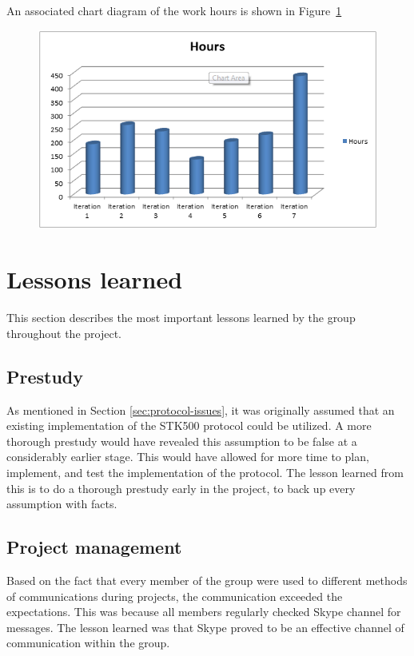 	An associated chart diagram of the work hours is shown in Figure~\ref{fig:workhours}

	\begin{figure}[H]
	\centering
	\label{fig:workhours}
	\includegraphics[scale=0.8]{images/workhours_chart2.png}
	\end{figure}

	\section{Lessons learned}
	This section describes the most important lessons learned by the group throughout the project. 

	\subsection{Prestudy}
	As mentioned in Section \ref{sec:protocol-issues}, it was originally assumed that an existing implementation of the STK500 protocol could be utilized. A more thorough prestudy would have revealed this assumption to be false at a considerably earlier stage. This would have allowed for more time to plan, implement, and test the implementation of the protocol. The lesson learned from this is to do a thorough prestudy early in the project, to back up every assumption with facts.

	\subsection{Project management}
	Based on the fact that every member of the group were used to different methods of communications during projects, the communication exceeded the expectations. This was because all members regularly checked Skype channel for messages. The lesson learned was that Skype proved to be an effective channel of communication within the group.\\

